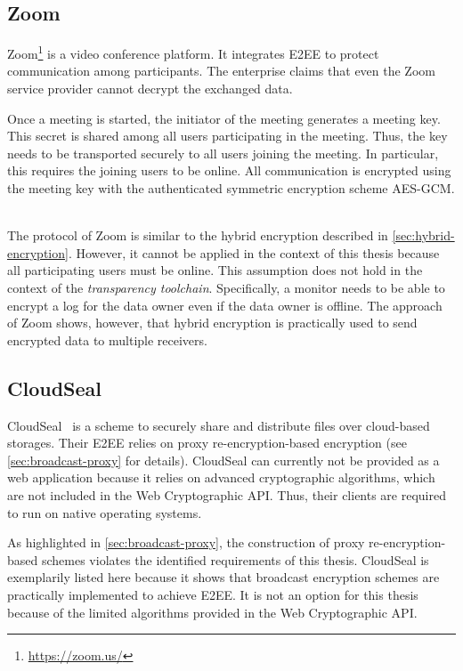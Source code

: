 \documentclass[../main.tex]{subfiles}
\begin{document}
\subsection{Zoom}
Zoom\footnote{\url{https://zoom.us/}} is a video conference platform. 
It integrates E2EE to protect communication among participants.
The enterprise claims that even the Zoom service provider cannot decrypt the exchanged data.~\cite{Blum2020}

Once a meeting is started, the initiator of the meeting generates a meeting key.
This secret is shared among all users participating in the meeting.
Thus, the key needs to be transported securely to all users joining the meeting.
In particular, this requires the joining users to be online.
All communication is encrypted using the meeting key with the authenticated symmetric encryption scheme AES-GCM.
~\cite{Isobe2021}

The protocol of Zoom is similar to the hybrid encryption described in \cref{sec:hybrid-encryption}.
However, it cannot be applied in the context of this thesis because all participating users must be online.
This assumption does not hold in the context of the \emph{transparency toolchain}.
Specifically, a monitor needs to be able to encrypt a log for the data owner even if the data owner is offline.
The approach of Zoom shows, however, that hybrid encryption is practically used to send encrypted data to multiple receivers.

\subsection{CloudSeal}
CloudSeal~\cite{Xiong2012} is a scheme to securely share and distribute files over cloud-based storages.
Their E2EE relies on proxy re-encryption-based encryption (see \cref{sec:broadcast-proxy} for details).
CloudSeal can currently not be provided as a web application because it relies on advanced cryptographic algorithms, which are not included in the Web Cryptographic API.
Thus, their clients are required to run on native operating systems.~\cite{Xiong2012}

As highlighted in \cref{sec:broadcast-proxy}, the construction of proxy re-encryption-based schemes violates the identified requirements of this thesis.
CloudSeal is exemplarily listed here because it shows that broadcast encryption schemes are practically implemented to achieve E2EE.
It is not an option for this thesis because of the limited algorithms provided in the Web Cryptographic API.
\end{document}

